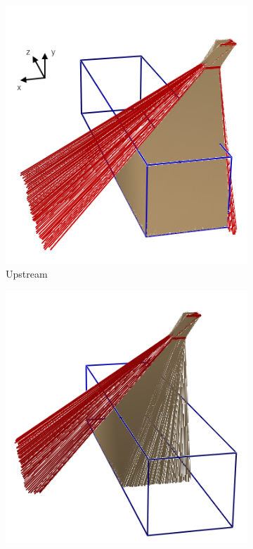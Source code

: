 \documentclass[a4paper,11pt]{article}
\begin{document}
\begin{figure}[htbp]
  \begin{subfigure}{0.30\textwidth}
    \includegraphics[width=\linewidth]{figures/upstream.png}
    \caption{Upstream} \label{fig:upstream}
  \end{subfigure}
  \begin{subfigure}{0.30\textwidth}
    \includegraphics[width=\linewidth]{figures/center.png}

\end{subfigure}
\end{figure}
\end{document}
